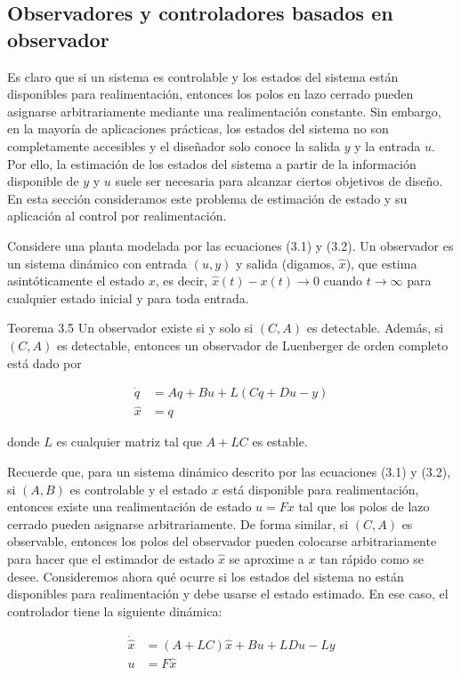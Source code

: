 \documentclass[11pt]{article}
\begin{document}
\subsection*{Observadores y controladores basados en observador}
Es claro que si un sistema es controlable y los estados del sistema están disponibles para realimentación, entonces los polos en lazo cerrado pueden asignarse arbitrariamente mediante una realimentación constante. Sin embargo, en la mayoría de aplicaciones prácticas, los estados del sistema no son completamente accesibles y el diseñador solo conoce la salida $y$ y la entrada $u$. Por ello, la estimación de los estados del sistema a partir de la información disponible de $y$ y $u$ suele ser necesaria para alcanzar ciertos objetivos de diseño. En esta sección consideramos este problema de estimación de estado y su aplicación al control por realimentación.

Considere una planta modelada por las ecuaciones (3.1) y (3.2). Un observador es un sistema dinámico con entrada $(u, y)$ y salida (digamos, $\hat{x}$), que estima asintóticamente el estado $x$, es decir, $\hat{x}(t)-x(t) \rightarrow 0$ cuando $t \rightarrow \infty$ para cualquier estado inicial y para toda entrada.

Teorema 3.5 Un observador existe si y solo si $(C, A)$ es detectable. Además, si $(C, A)$ es detectable, entonces un observador de Luenberger de orden completo está dado por


\begin{align*}
\dot{q} & =A q+B u+L(C q+D u-y)  \tag{3.3}\\
\hat{x} & =q \tag{3.4}
\end{align*}


donde $L$ es cualquier matriz tal que $A+L C$ es estable.

Recuerde que, para un sistema dinámico descrito por las ecuaciones (3.1) y (3.2), si $(A, B)$ es controlable y el estado $x$ está disponible para realimentación, entonces existe una realimentación de estado $u=F x$ tal que los polos de lazo cerrado pueden asignarse arbitrariamente. De forma similar, si $(C, A)$ es observable, entonces los polos del observador pueden colocarse arbitrariamente para hacer que el estimador de estado $\hat{x}$ se aproxime a $x$ tan rápido como se desee. Consideremos ahora qué ocurre si los estados del sistema no están disponibles para realimentación y debe usarse el estado estimado. En ese caso, el controlador tiene la siguiente dinámica:

$$
\begin{aligned}
\dot{\hat{x}} & =(A+L C) \hat{x}+B u+L D u-L y \\
u & =F \hat{x}
\end{aligned}
$$
\end{document}
